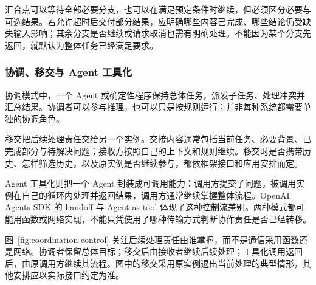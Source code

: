 \documentclass[11pt,a4paper]{article}
\begin{document}
汇合点可以等待全部必要分支，也可以在满足预定条件时继续，但必须区分必要与可选结果。若允许超时后交付部分结果，应明确哪些内容已完成、哪些结论仍受缺失输入影响；其余分支是否继续或请求取消也需有明确处理。不能因为某个分支先返回，就默认为整体任务已经满足要求。

\subsubsection{协调、移交与 Agent 工具化}

协调模式中，一个 Agent 或确定性程序保持总体任务，派发子任务、处理冲突并汇总结果。协调者可以参与推理，也可以只是按规则运行；并非每种系统都需要单独的协调角色。

移交把后续处理责任交给另一个实例。交接内容通常包括当前任务、必要背景、已完成部分与待解决问题；接收方按照自己的上下文和规则继续。移交时是否携带历史、怎样筛选历史，以及原实例是否继续参与，都依框架接口和应用安排而定。

Agent 工具化则把一个 Agent 封装成可调用能力：调用方提交子问题，被调用实例在自己的循环内处理并返回结果，调用方通常继续掌握整体流程。OpenAI Agents SDK 的 handoff 与 Agent-as-tool 体现了这种控制流差别\cite{agents-sdk}。两种模式都可能用函数或网络实现，不能只凭使用了哪种传输方式判断协作责任是否已经转移。


图~\ref{fig:coordination-control} 关注后续处理责任由谁掌握，而不是通信采用函数还是网络。协调者保留总体目标；移交后由接收者继续后续处理；工具化调用返回后，由原调用方继续其流程。图中的移交采用原实例退出当前处理的典型情形，其他安排应以实际接口约定为准。
\end{document}
